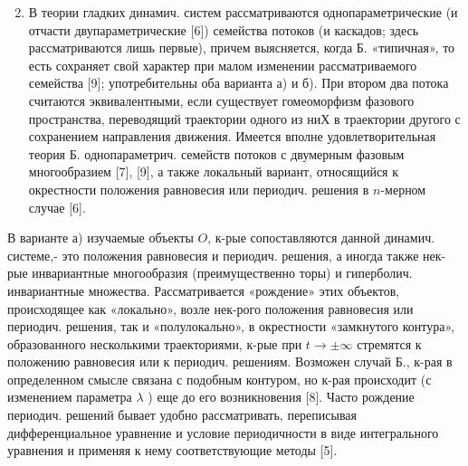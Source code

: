 \documentclass[10pt]{article}
\begin{document}
\begin{enumerate}

  \setcounter{enumi}{1}

  \item В теории гладких динамич. систем рассматриваются однопараметрические (и отчасти двупараметрические [6]) семейства потоков (и каскадов; здесь рассматриваются лишь первые), причем выясняется, когда Б. «типичная», то есть сохраняет свой характер при малом изменении рассматриваемого семейства [9]; употребительны оба варианта а) и б). При втором два потока считаются эквивалентными, если существует гомеоморфизм фазового пространства, переводящий траектории одного из ниХ в траектории другого с сохранением направления движения. Имеется вполне удовлетворительная теория Б. однопараметрич. семейств потоков с двумерным фазовым многообразием [7], [9], а также локальный вариант, относящийся к окрестности положения равновесия или периодич. решения в $n$-мерном случае [6].

\end{enumerate}



В варианте а) изучаемые объекты $O$, к-рые сопоставляются данной динамич. системе,- это положения равновесия и периодич. решения, а иногда также нек-рые инвариантные многообразия (преимущественно торы) и гиперболич. инвариантные множества. Рассматривается «рождение» этих объектов, происходящее как «локально», возле нек-рого положения равновесия или периодич. решения, так и «полулокально», в окрестности «замкнутого контура», образованного несколькими траекториями, к-рые при $t \rightarrow \pm \infty$ стремятся к положению равновесия или к периодич. решениям. Возможен случай Б., к-рая в определенном смысле связана с подобным контуром, но к-рая происходит (с изменением параметра $\lambda$ ) еще до его возникновения [8]. Часто рождение периодич. решений бывает удобно рассматривать, переписывая дифференциальное уравнение и условие периодичности в виде интегрального уравнения и применяя к нему соответствующие методы [5].
\end{document}

